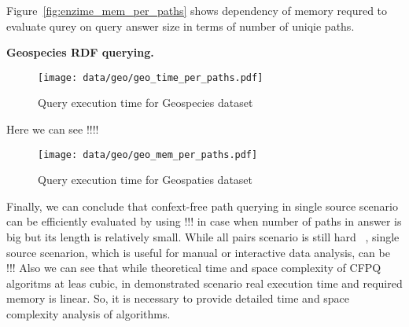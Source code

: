 Figure~\ref{fig:enzime_mem_per_paths} shows dependency of memory requred to evaluate qurey on query answer size in terms of number of uniqie paths.


\textbf{Geospecies RDF querying.}

\begin{figure}[ht]
  \begin{center}
    \texttt{[image: data/geo/geo\_time\_per\_paths.pdf]}
    \caption{Query execution time for Geospecies dataset}
    \label{fig:geo_time_per_paths}
  \end{center}
\end{figure}

Here we can see !!!!

\begin{figure}[ht]
  \begin{center}
    \texttt{[image: data/geo/geo\_mem\_per\_paths.pdf]}
    \caption{Query execution time for Geospaties dataset}
    \label{fig:geo_time_per_paths}
  \end{center}
\end{figure}

Finally, we can conclude that confext-free path querying in single source scenario can be efficiently evaluated by using !!! in case when number of paths in answer is big but its length is relatively small.
While all pairs scenario is still hard ~\cite{!!!}, single source scenarion, which is useful for manual or interactive data analysis, can be !!!
Also we can see that while theoretical time and space complexity of CFPQ algoritms at leas cubic, in demonstrated scenario real execution time and required memory is linear.
So, it is necessary to provide detailed time and space complexity analysis of algorithms.
